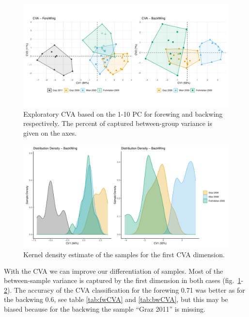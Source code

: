 \documentclass[
]{article}
\begin{document}
\begin{figure}[H]

{\centering \includegraphics[width=1\linewidth,]{images/cvaPlot} 

}

\caption{Exploratory CVA based on the 1-10 PC for forewing and backwing respectively. The percent of captured between-group variance is given on the axes.}\label{fig:CVA}
\end{figure}



\begin{figure}[H]

{\centering \includegraphics[width=0.8\linewidth,]{images/densPlot} 

}

\caption{Kernel density estimate of the samples for the first CVA dimension.}\label{fig:densCVA}
\end{figure}

With the CVA we can improve our differentiation of samples. Most of the between-sample variance is captured by the first dimension in both cases (fig.~\ref{fig:CVA}-\ref{fig:densCVA}). The accuracy of the CVA classification for the forewing 0.71 was better as for the backwing 0.6, see table \ref{tab:fwCVA} and \ref{tab:bwCVA}, but this may be biased because for the backwing the sample ``Graz 2011'' is missing.
\end{document}
